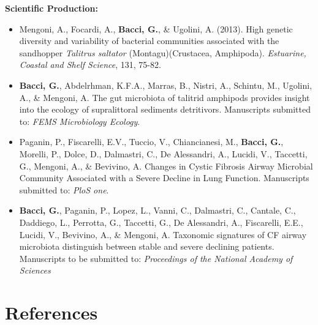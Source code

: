 \documentclass[10pt]{beamer}
\begin{document}
\begin{frame}
	\textbf{\Large{Scientific Production:}}
	\footnotesize{%
	\begin{itemize}
		\item Mengoni, A., Focardi, A., \textbf{Bacci, G.}, \& Ugolini, A. (2013). High genetic diversity and variability of bacterial communities associated with the sandhopper \textit{Talitrus saltator} (Montagu)(Crustacea, Amphipoda). \textit{Estuarine, Coastal and Shelf Science}, 131, 75-82.
		\item \textbf{Bacci, G.}, Abdelrhman, K.F.A., Marras, B., Nistri, A., Schintu, M., Ugolini, A., \& Mengoni, A. The gut microbiota of talitrid amphipods provides insight into the ecology of supralittoral sediments detritivors. Manuscripts submitted to: \textit{FEMS Microbiology Ecology}.
		\item Paganin, P., Fiscarelli, E.V., Tuccio, V., Chiancianesi, M., \textbf{Bacci, G.}, Morelli, P., Dolce, D., Dalmastri, C., De Alessandri, A., Lucidi, V., Taccetti, G., Mengoni, A., \& Bevivino, A. Changes in Cystic Fibrosis Airway Microbial Community Associated with a Severe Decline in Lung Function. Manuscripts submitted to: \textit{PloS one}.
		\item \textbf{Bacci, G.}, Paganin, P., Lopez, L., Vanni, C., Dalmastri, C., Cantale, C., Daddiego, L., Perrotta, G., Taccetti, G., De Alessandri, A., Fiscarelli, E.E., Lucidi, V., Bevivino, A., \& Mengoni, A. Taxonomic signatures of CF airway microbiota distinguish between stable and severe declining patients. Manuscripts to be  submitted to: \textit{Proceedings of the National Academy of Sciences}
	\end{itemize}
	}
\end{frame}	
	

\section{References}
\subsection{}
\begin{frame}[allowframebreaks] 
	\tiny
	
\end{frame}
\end{document}
